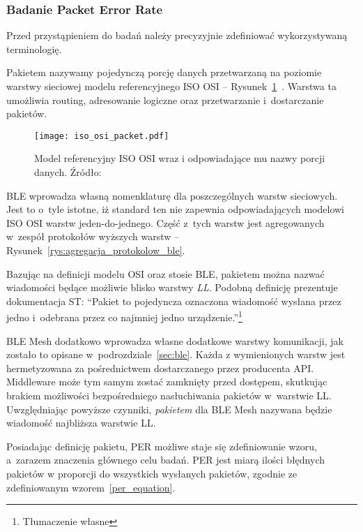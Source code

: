\subsubsection{Badanie Packet Error Rate}\label{subsec:per_experiment}
Przed przystąpieniem do badań należy precyzyjnie zdefiniować wykorzystywaną terminologię.

Pakietem nazywamy pojedynczą porcję danych przetwarzaną na poziomie warstwy sieciowej modelu referencyjnego ISO OSI -- Rysunek~\ref{rys:iso_osi_model_nazwy_grup_danych}~\cite{sa_tcpip_nodate}.
Warstwa ta umożliwia routing, adresowanie logiczne oraz przetwarzanie i~dostarczanie pakietów.

\begin{figure}[!ht]
	\centering \texttt{[image: iso\_osi\_packet.pdf]} 
	\caption{Model referencyjny ISO OSI wraz i odpowiadające mu nazwy porcji danych. Źródło: \cite{sa_tcpip_nodate}}
	\label{rys:iso_osi_model_nazwy_grup_danych}
\end{figure}

\gls{BLE} wprowadza własną nomenklaturę dla poszczególnych warstw sieciowych. Jest to o~tyle istotne, iż standard ten
nie zapewnia odpowiadających modelowi ISO OSI warstw jeden-do-jednego. Część z~tych warstw jest agregowanych w~zespół 
protokołów wyższych warstw -- Rysunek~\ref{rys:agregacja_protokolow_ble}. %

Bazując na definicji modelu OSI oraz stosie BLE, pakietem można nazwać wiadomości będące możliwie blisko
warstwy \textit{\gls{LL}}. Podobną definicję prezentuje dokumentacja ST:
\enquote{Pakiet to pojedyncza oznaczona wiadomość wysłana przez jedno i~odebrana przez 
co najmniej jedno urządzenie.}\footnote{Tłumaczenie własne}~\cite{stmicroelectronics_pm0271_2021}

BLE Mesh dodatkowo wprowadza własne dodatkowe warstwy komunikacji, jak zostało to opisane w~podrozdziale~\ref{sec:ble}.
Każda z wymienionych warstw jest hermetyzowana za pośrednictwem dostarczanego przez producenta \gls{API}.
Middleware może tym samym zostać zamknięty przed dostępem, skutkując brakiem możliwości 
bezpośredniego nasłuchiwania pakietów w~warstwie \gls{LL}. Uwzględniając powyższe czynniki, \textit{pakietem} dla BLE Mesh nazywana będzie wiadomość najbliższa warstwie \gls{LL}.

Posiadając definicję pakietu, \gls{PER} możliwe staje się zdefiniowanie wzoru, a~zarazem znaczenia
głównego celu badań. PER jest miarą ilości błędnych pakietów w proporcji do wszystkich wysłanych 
pakietów, zgodnie ze zdefiniowanym wzorem~\ref{per_equation}.

